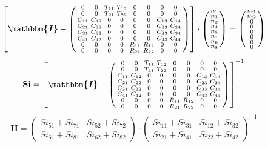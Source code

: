 \[ \left[ \boldsymbol{\mathbbm{I}}  - \left(\begin{smallmatrix} 0 & 0
& T_{11} & T_{12} & 0 & 0 & 0 & 0 \\ 0 & 0 & T_{21} & T_{22} & 0 & 0 &
0 & 0 \\ C_{11} & C_{12} & 0 & 0 & 0 & 0 & C_{13} & C_{14} \\ C_{21} &
C_{22} & 0 & 0 & 0 & 0 & C_{23} & C_{24} \\ C_{31} & C_{32} & 0 & 0 &
0 & 0 & C_{33} & C_{34} \\ C_{41} & C_{42} & 0 & 0 & 0 & 0 & C_{43} &
C_{44} \\ 0 & 0 & 0 & 0 & R_{11} & R_{12} & 0 & 0 \\ 0 & 0 & 0 & 0 &
R_{21} & R_{22} & 0 & 0 \end{smallmatrix}\right)\right] \cdot
\left(\begin{smallmatrix} n_{1} \\ n_{3} \\ n_{2} \\ n_{4} \\ n_{5} \\
n_{7} \\ n_{6} \\ n_{8} \end{smallmatrix}\right) =
\left(\begin{smallmatrix} m_{1} \\ m_{2} \\ 0 \\ 0 \\ 0 \\ 0 \\ 0 \\ 0
\end{smallmatrix}\right) \]
\[ \mathbf{Si} = \left[ \boldsymbol{\mathbbm{I}}  -
\left(\begin{smallmatrix} 0 & 0 & T_{11} & T_{12} & 0 & 0 & 0 & 0 \\ 0
& 0 & T_{21} & T_{22} & 0 & 0 & 0 & 0 \\ C_{11} & C_{12} & 0 & 0 & 0 &
0 & C_{13} & C_{14} \\ C_{21} & C_{22} & 0 & 0 & 0 & 0 & C_{23} &
C_{24} \\ C_{31} & C_{32} & 0 & 0 & 0 & 0 & C_{33} & C_{34} \\ C_{41}
& C_{42} & 0 & 0 & 0 & 0 & C_{43} & C_{44} \\ 0 & 0 & 0 & 0 & R_{11} &
R_{12} & 0 & 0 \\ 0 & 0 & 0 & 0 & R_{21} & R_{22} & 0 & 0
\end{smallmatrix}\right) \right]^{-1} \]
\[ \mathbf{H} = \left(\begin{smallmatrix} Si_{51} + Si_{71} & Si_{52}
+ Si_{72} \\ Si_{61} + Si_{81} & Si_{62} + Si_{82}
\end{smallmatrix}\right)\cdot \left(\begin{smallmatrix} Si_{11} +
Si_{31} & Si_{12} + Si_{32} \\ Si_{21} + Si_{41} & Si_{22} + Si_{42}
\end{smallmatrix}\right)^{-1} \]
